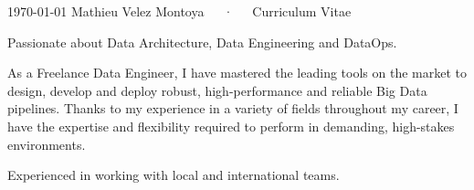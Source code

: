 \documentclass[11pt, a4paper]{awesome-cv}
\begin{document}
\makecvheader
\makecvfooter
{\today}
{Mathieu Velez Montoya~~~·~~~Curriculum Vitae}
{}


\begin{cvparagraph}
    Passionate about Data Architecture, Data Engineering and DataOps.

    As a Freelance Data Engineer, I have mastered the leading tools on the market to design, develop and deploy robust, high-performance and reliable Big Data pipelines. Thanks to my experience in a variety of fields throughout my career,
    I have the expertise and flexibility required to perform in demanding, high-stakes environments.
    
    Experienced in working with local and international teams.
\end{cvparagraph}





\end{document}
